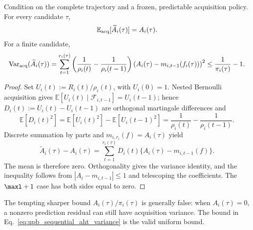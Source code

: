 \begin{proposition}
\label{prop:valid_upb_weights}
Condition on the complete trajectory and a frozen, predictable acquisition
policy. For every candidate \(\tau\),
\begin{equation}
    \mathbb E_{\rm acq}[\widetilde A_i(\tau)]=A_i(\tau).
    \label{eq:valid_upb_weight_identity}
\end{equation}
For a finite candidate,
\begin{equation}
\begin{split}
    \operatorname{Var}_{\rm acq}(\widetilde A_i(\tau))
    =\sum_{t=1}^{r_i(\tau)}
      \left(\frac{1}{\rho_i(t)}-\frac{1}{\rho_i(t-1)}\right)
      \left(A_i(\tau)-m_{i,t-1}(f_i(\tau))\right)^2
    \leq \frac{1}{\pi_i(\tau)}-1.
    \label{eq:upb_sequential_aht_variance}
\end{split}
\end{equation}
\end{proposition}

\begin{proof}
Set \(U_i(t):=R_i(t)/\rho_i(t)\), with \(U_i(0)=1\). Nested Bernoulli
acquisition gives
\(\mathbb E[U_i(t)\mid\mathcal F_{i,t-1}]=U_i(t-1)\); hence
\(D_i(t):=U_i(t)-U_i(t-1)\) are orthogonal martingale differences and
\begin{equation}
    \mathbb E[D_i(t)^2]
    =\mathbb E[U_i(t)^2]-\mathbb E[U_i(t-1)^2]
    =\frac{1}{\rho_i(t)}-\frac{1}{\rho_i(t-1)}.
\end{equation}
Discrete summation by parts and \(m_{i,r_i}(f)=A_i(\tau)\) yield
\begin{equation}
    \widetilde A_i(\tau)-A_i(\tau)
    =\sum_{t=1}^{r_i(\tau)}
       D_i(t)\{A_i(\tau)-m_{i,t-1}(f)\}.
\end{equation}
The mean is therefore zero. Orthogonality gives the variance identity, and
the inequality follows from \(|A_i-m_{i,t-1}|\leq1\) and telescoping the
coefficients. The \(\maxl+1\) case has both sides equal to zero.
\end{proof}

The tempting sharper bound
\(A_i(\tau)/\pi_i(\tau)\) is generally false: when \(A_i(\tau)=0\), a
nonzero prediction residual can still have acquisition variance. The bound
in Eq.~\eqref{eq:upb_sequential_aht_variance} is the valid uniform bound.

